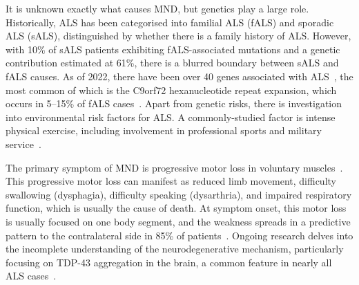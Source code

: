 It is unknown exactly what causes MND, but genetics play a large role.
Historically, ALS has been categorised into familial ALS (fALS) and sporadic ALS (sALS), distinguished by whether there is a family history of ALS.
However, with 10\% of sALS patients exhibiting fALS-associated mutations and a genetic contribution estimated at 61\%, there is a blurred boundary between sALS and fALS causes.
As of 2022, there have been over 40 genes associated with ALS~\cite{goutmanRecentAdvancesDiagnosis2022a}, the most common of which is the C9orf72 hexanucleotide repeat expansion, which occurs in 5--15\% of fALS cases~\cite{vanesAmyotrophicLateralSclerosis2017}.
Apart from genetic risks, there is investigation into environmental risk factors for ALS. A commonly-studied factor is intense physical exercise, including involvement in professional sports and military service~\cite{mckayMilitaryServiceRelated2021, lacortePhysicalActivityPhysical2016}.


The primary symptom of MND is progressive motor loss in voluntary muscles~\cite{vanesAmyotrophicLateralSclerosis2017}.
This progressive motor loss can manifest as reduced limb movement, difficulty swallowing (dysphagia), difficulty speaking (dysarthria), and impaired respiratory function, which is usually the cause of death.
At symptom onset, this motor loss is usually focused on one body segment, and the weakness spreads in a predictive pattern to the contralateral side in 85\% of patients~\cite{walhoutPatternsSymptomDevelopment2018}.
Ongoing research delves into the incomplete understanding of the neurodegenerative mechanism, particularly focusing on TDP-43 aggregation in the brain, a common feature in nearly all ALS cases~\cite{blokhuisProteinAggregationAmyotrophic2013}.

